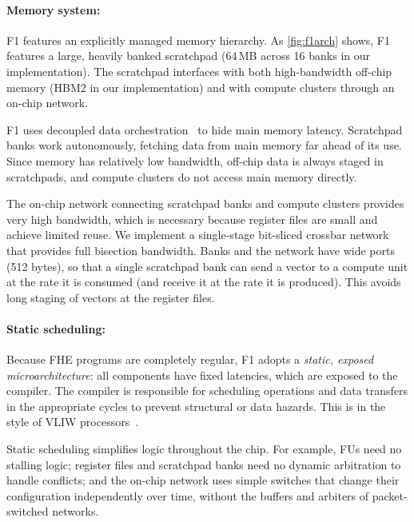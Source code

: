 
\figFOneArch


\paragraph{Memory system:}
F1 features an explicitly managed memory hierarchy. As \autoref{fig:f1arch} shows,
F1 features a large, heavily banked scratchpad (64\,MB across {16} banks in our implementation).
The scratchpad interfaces with both high-bandwidth off-chip memory (HBM2 in our implementation)
and with compute clusters through an on-chip network.

F1 uses decoupled data orchestration~\cite{pellauer:asplos19:buffets} to hide main memory latency.
Scratchpad banks work autonomously, fetching data from main memory far ahead of its use.
Since memory has relatively low bandwidth, off-chip data is always staged in scratchpads,
and compute clusters do not access main memory directly.

The on-chip network connecting scratchpad banks and compute clusters provides very high bandwidth,
which is necessary because register files are small and achieve limited reuse.
We implement a single-stage bit-sliced crossbar network~\cite{passas:tocaid12:crossbar} that provides full bisection bandwidth.
Banks and the network have wide ports (512 bytes), so that a single scratchpad bank can send a vector to a compute unit
at the rate it is consumed (and receive it at the rate it is produced).
This avoids long staging of vectors at the register files.

\paragraph{Static scheduling:}
Because FHE programs are completely regular, F1 adopts a \emph{static, exposed microarchitecture}:
all components have fixed latencies, which are exposed to the compiler.
The compiler is responsible for scheduling operations and data transfers in the appropriate cycles to prevent
structural or data hazards.
This is in the style of VLIW processors~\cite{fisher:isca83:very}.

Static scheduling simplifies logic throughout the chip. For example, FUs need no stalling logic;
register files and scratchpad banks need no dynamic arbitration to handle conflicts;
and the on-chip network uses simple switches that change their configuration independently over time,
without the buffers and arbiters of packet-switched networks.

